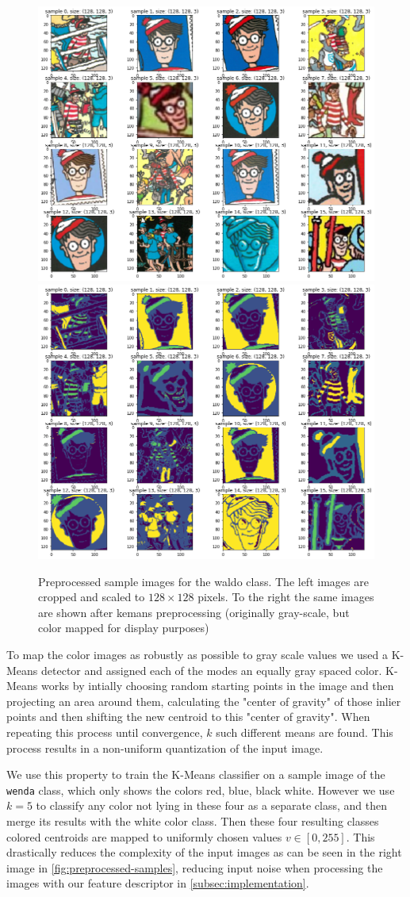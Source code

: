 \documentclass[11pt]{article}
\begin{document}
\begin{figure}[h]
    \centering
    \includegraphics[width=0.4\linewidth]{figures/preprocess_waldo} 
    \hspace{1cm}
    \includegraphics[width=0.4\linewidth]{figures/kmeans_waldo} 
    \caption{Preprocessed sample images for the waldo class. The left images are cropped and scaled to \( 128 \times 128 \) pixels.
    To the right the same images are shown after kemans preprocessing (originally gray-scale, but color mapped for display purposes)}
    \label{fig:preprocessed-samples}
\end{figure}

To map the color images as robustly as possible to gray scale values we used a K-Means detector 
and assigned each of the modes an equally gray spaced color. 
K-Means works by intially choosing random starting points in the image and then projecting an area around them, calculating the "center of gravity"
of those inlier points and then shifting the new centroid to this "center of gravity". When repeating this
process until convergence, \( k \) such different means are found. This process results in a non-uniform quantization of the input image.

We use this property to train the K-Means classifier on a sample image of the \verb|wenda| class, which only 
shows the colors red, blue, black white. However we use \( k=5 \) to classify any color not lying in these four as a separate class, and then merge 
its results with the white color class. Then these four resulting classes colored centroids are mapped to uniformly
chosen values \( v \in [0, 255] \). This drastically reduces the complexity of the input images as can be seen in the right image in \autoref{fig:preprocessed-samples},
reducing input noise when processing the images with our feature descriptor in \autoref{subsec:implementation}.
\end{document}
